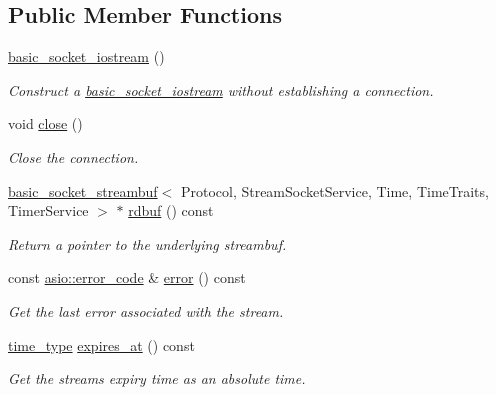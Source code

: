 \subsection*{Public Member Functions}
\begin{DoxyCompactItemize}
\item 
\hyperlink{classasio_1_1basic__socket__iostream_a3208646eabb1520430abcbaa8930e1d0}{basic\+\_\+socket\+\_\+iostream} ()
\begin{DoxyCompactList}\small\item\em Construct a \hyperlink{classasio_1_1basic__socket__iostream}{basic\+\_\+socket\+\_\+iostream} without establishing a connection. \end{DoxyCompactList}\item 
void \hyperlink{classasio_1_1basic__socket__iostream_a64a63cc863cfb727a2d92744c2474d65}{close} ()
\begin{DoxyCompactList}\small\item\em Close the connection. \end{DoxyCompactList}\item 
\hyperlink{classasio_1_1basic__socket__streambuf}{basic\+\_\+socket\+\_\+streambuf}$<$ Protocol, Stream\+Socket\+Service, Time, Time\+Traits, Timer\+Service $>$ $\ast$ \hyperlink{classasio_1_1basic__socket__iostream_ad8158862edcecfc312c0229631e1d0d6}{rdbuf} () const 
\begin{DoxyCompactList}\small\item\em Return a pointer to the underlying streambuf. \end{DoxyCompactList}\item 
const \hyperlink{classasio_1_1error__code}{asio\+::error\+\_\+code} \& \hyperlink{classasio_1_1basic__socket__iostream_ac097d22cda9278971de01f140c98fbbf}{error} () const 
\begin{DoxyCompactList}\small\item\em Get the last error associated with the stream. \end{DoxyCompactList}\item 
\hyperlink{classasio_1_1basic__socket__iostream_a1f1cbdf5a23170d9d7b4a03f4dcf1a03}{time\+\_\+type} \hyperlink{classasio_1_1basic__socket__iostream_ac60151b0770ae0285a3d61d170626353}{expires\+\_\+at} () const 
\begin{DoxyCompactList}\small\item\em Get the stream\textquotesingle{}s expiry time as an absolute time. \end{DoxyCompactList}\item 

\end{DoxyCompactItemize}
